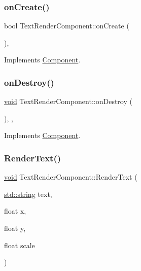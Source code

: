 \subsubsection{\texorpdfstring{on\+Create()}{onCreate()}}
{\footnotesize\ttfamily bool Text\+Render\+Component\+::on\+Create (\begin{DoxyParamCaption}{ }\end{DoxyParamCaption})\hspace{0.3cm}{\ttfamily [override]}, {\ttfamily [virtual]}}



Implements \hyperlink{classComponent_a3a1537a8b8bcdb2155afbb925c77b0a2}{Component}.

\mbox{\label{classTextRenderComponent_a097fb07ecd0e1feed1c4c2bd7c97d480}} 
\subsubsection{\texorpdfstring{on\+Destroy()}{onDestroy()}}
{\footnotesize\ttfamily \hyperlink{imgui__impl__opengl3__loader_8h_ac668e7cffd9e2e9cfee428b9b2f34fa7}{void} Text\+Render\+Component\+::on\+Destroy (\begin{DoxyParamCaption}{ }\end{DoxyParamCaption})\hspace{0.3cm}{\ttfamily [inline]}, {\ttfamily [override]}, {\ttfamily [virtual]}}



Implements \hyperlink{classComponent_a2b198f27162a6caf63917e304295f892}{Component}.

\mbox{\label{classTextRenderComponent_a548a98c1048447ac5c27aae8dcf1df36}} 
\subsubsection{\texorpdfstring{Render\+Text()}{RenderText()}}
{\footnotesize\ttfamily \hyperlink{imgui__impl__opengl3__loader_8h_ac668e7cffd9e2e9cfee428b9b2f34fa7}{void} Text\+Render\+Component\+::\+Render\+Text (\begin{DoxyParamCaption}\item[{\hyperlink{imgui__impl__opengl3__loader_8h_ac83513893df92266f79a515488701770}{std\+::string}}]{text,  }\item[{float}]{x,  }\item[{float}]{y,  }\item[{float}]{scale }\end{DoxyParamCaption})}

